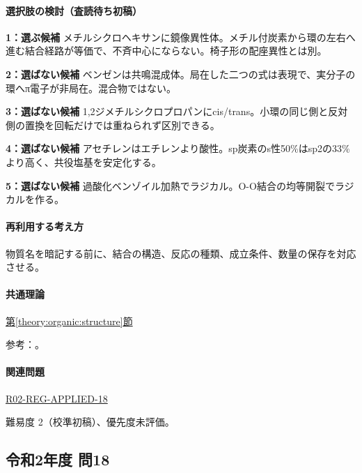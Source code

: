 \paragraph{選択肢の検討（査読待ち初稿）}\mbox{}\par

\noindent\textbf{1：選ぶ候補} メチルシクロヘキサンに鏡像異性体。メチル付炭素から環の左右へ進む結合経路が等価で、不斉中心にならない。椅子形の配座異性とは別。\par

\noindent\textbf{2：選ばない候補} ベンゼンは共鳴混成体。局在した二つの式は表現で、実分子の環へπ電子が非局在。混合物ではない。\par

\noindent\textbf{3：選ばない候補} 1,2ジメチルシクロプロパンにcis/trans。小環の同じ側と反対側の置換を回転だけでは重ねられず区別できる。\par

\noindent\textbf{4：選ばない候補} アセチレンはエチレンより酸性。sp炭素のs性50\%はsp2の33\%より高く、共役塩基を安定化する。\par

\noindent\textbf{5：選ばない候補} 過酸化ベンゾイル加熱でラジカル。O-O結合の均等開裂でラジカルを作る。\par

\paragraph{再利用する考え方} 物質名を暗記する前に、結合の構造、反応の種類、成立条件、数量の保存を対応させる。

\paragraph{共通理論} \hyperref[theory:organic:structure]{第\ref*{theory:organic:structure}節}

\par 参考：\cite{organic_chirality,organic_benzene}。

\paragraph{関連問題} \hyperref[q:r02-reg-applied-18]{R02-REG-APPLIED-18}

\par 難易度 2（校準初稿）、優先度未評価。

\subsection{令和2年度 問18}
\label{q:r02-reg-applied-18}

